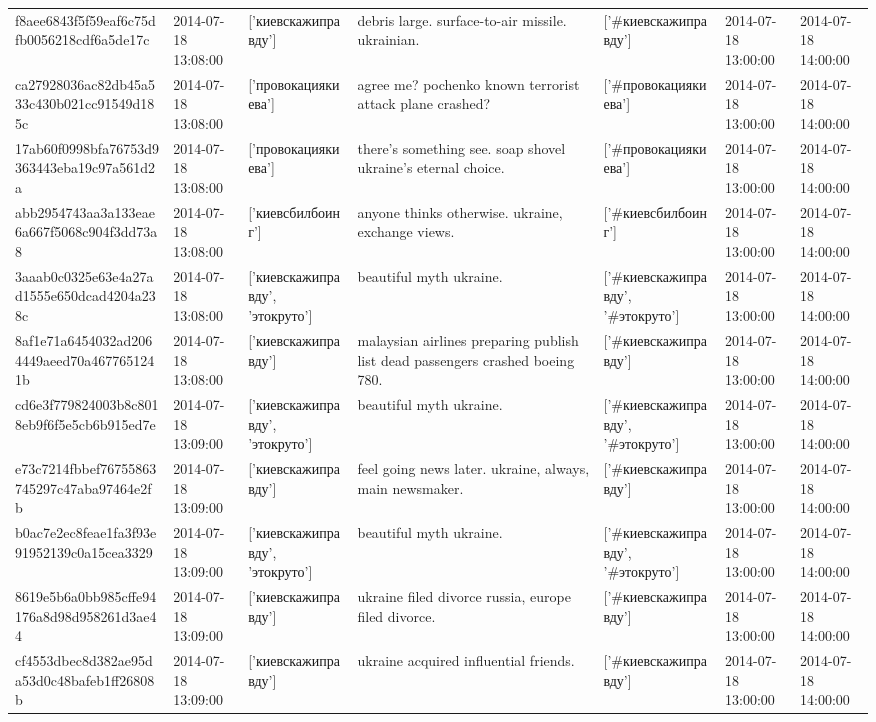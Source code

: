 \begin{tabular}{lllllll}
f8aee6843f5f59eaf6c75dfb0056218cdf6a5de17c & 2014-07-18 13:08:00 & ['киевскажиправду'] & debris large. surface-to-air missile. ukrainian. & ['#киевскажиправду'] & 2014-07-18 13:00:00 & 2014-07-18 14:00:00 \\
ca27928036ac82db45a533c430b021cc91549d185c & 2014-07-18 13:08:00 & ['провокациякиева'] & agree me? pochenko known terrorist attack plane crashed? & ['#провокациякиева'] & 2014-07-18 13:00:00 & 2014-07-18 14:00:00 \\
17ab60f0998bfa76753d9363443eba19c97a561d2a & 2014-07-18 13:08:00 & ['провокациякиева'] & there's something see. soap shovel ukraine's eternal choice. & ['#провокациякиева'] & 2014-07-18 13:00:00 & 2014-07-18 14:00:00 \\
abb2954743aa3a133eae6a667f5068c904f3dd73a8 & 2014-07-18 13:08:00 & ['киевсбилбоинг'] & anyone thinks otherwise. ukraine, exchange views. & ['#киевсбилбоинг'] & 2014-07-18 13:00:00 & 2014-07-18 14:00:00 \\
3aaab0c0325e63e4a27ad1555e650dcad4204a238c & 2014-07-18 13:08:00 & ['киевскажиправду', 'этокруто'] & beautiful myth ukraine. & ['#киевскажиправду', '#этокруто'] & 2014-07-18 13:00:00 & 2014-07-18 14:00:00 \\
8af1e71a6454032ad2064449aeed70a4677651241b & 2014-07-18 13:08:00 & ['киевскажиправду'] & malaysian airlines preparing publish list dead passengers crashed boeing 780. & ['#киевскажиправду'] & 2014-07-18 13:00:00 & 2014-07-18 14:00:00 \\
cd6e3f779824003b8c8018eb9f6f5e5cb6b915ed7e & 2014-07-18 13:09:00 & ['киевскажиправду', 'этокруто'] & beautiful myth ukraine. & ['#киевскажиправду', '#этокруто'] & 2014-07-18 13:00:00 & 2014-07-18 14:00:00 \\
e73c7214fbbef76755863745297c47aba97464e2fb & 2014-07-18 13:09:00 & ['киевскажиправду'] & feel going news later. ukraine, always, main newsmaker. & ['#киевскажиправду'] & 2014-07-18 13:00:00 & 2014-07-18 14:00:00 \\
b0ac7e2ec8feae1fa3f93e91952139c0a15cea3329 & 2014-07-18 13:09:00 & ['киевскажиправду', 'этокруто'] & beautiful myth ukraine. & ['#киевскажиправду', '#этокруто'] & 2014-07-18 13:00:00 & 2014-07-18 14:00:00 \\
8619e5b6a0bb985cffe94176a8d98d958261d3ae44 & 2014-07-18 13:09:00 & ['киевскажиправду'] & ukraine filed divorce russia, europe filed divorce. & ['#киевскажиправду'] & 2014-07-18 13:00:00 & 2014-07-18 14:00:00 \\
cf4553dbec8d382ae95da53d0c48bafeb1ff26808b & 2014-07-18 13:09:00 & ['киевскажиправду'] & ukraine acquired influential friends. & ['#киевскажиправду'] & 2014-07-18 13:00:00 & 2014-07-18 14:00:00 \\

\end{tabular}
